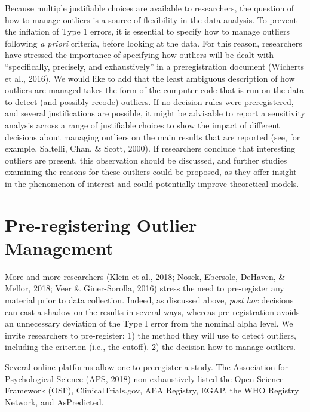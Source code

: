 \documentclass[man,floatsintext]{apa6}
\begin{document}
Because multiple justifiable choices are available to researchers, the question of how to manage outliers is a source of flexibility in the data analysis. To prevent the inflation of Type 1 errors, it is essential to specify how to manage outliers following \emph{a priori} criteria, before looking at the data. For this reason, researchers have stressed the importance of specifying how outliers will be dealt with \enquote{specifically, precisely, and exhaustively} in a preregistration document (Wicherts et al., 2016). We would like to add that the least ambiguous description of how outliers are managed takes the form of the computer code that is run on the data to detect (and possibly recode) outliers. If no decision rules were preregistered, and several justifications are possible, it might be advisable to report a sensitivity analysis across a range of justifiable choices to show the impact of different decisions about managing outliers on the main results that are reported (see, for example, Saltelli, Chan, \& Scott, 2000). If researchers conclude that interesting outliers are present, this observation should be discussed, and further studies examining the reasons for these outliers could be proposed, as they offer insight in the phenomenon of interest and could potentially improve theoretical models.

\hypertarget{pre-registering-outlier-management}{%
\section{Pre-registering Outlier Management}\label{pre-registering-outlier-management}}

More and more researchers (Klein et al., 2018; Nosek, Ebersole, DeHaven, \& Mellor, 2018; Veer \& Giner-Sorolla, 2016) stress the need to pre-register any material prior to data collection. Indeed, as discussed above, \emph{post hoc} decisions can cast a shadow on the results in several ways, whereas pre-registration avoids an unnecessary deviation of the Type I error from the nominal alpha level. We invite researchers to pre-register:
1) the method they will use to detect outliers, including the criterion (i.e., the cutoff).
2) the decision how to manage outliers.

Several online platforms allow one to preregister a study. The Association for Psychological Science (APS, 2018) non exhaustively listed the Open Science Framework (OSF), ClinicalTrials.gov, AEA Registry, EGAP, the WHO Registry Network, and AsPredicted.
\end{document}

